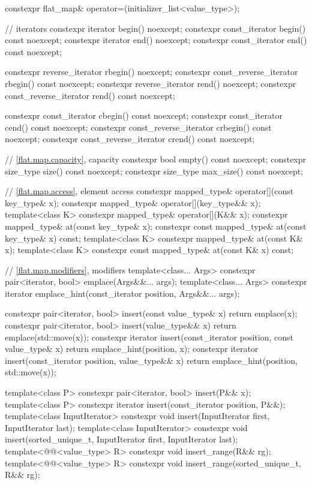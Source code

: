 \begin{codeblock}
{{    constexpr flat_map& operator=(initializer_list<value_type>);

    // iterators
    constexpr iterator               begin() noexcept;
    constexpr const_iterator         begin() const noexcept;
    constexpr iterator               end() noexcept;
    constexpr const_iterator         end() const noexcept;

    constexpr reverse_iterator       rbegin() noexcept;
    constexpr const_reverse_iterator rbegin() const noexcept;
    constexpr reverse_iterator       rend() noexcept;
    constexpr const_reverse_iterator rend() const noexcept;

    constexpr const_iterator         cbegin() const noexcept;
    constexpr const_iterator         cend() const noexcept;
    constexpr const_reverse_iterator crbegin() const noexcept;
    constexpr const_reverse_iterator crend() const noexcept;

    // \ref{flat.map.capacity}, capacity
    constexpr bool empty() const noexcept;
    constexpr size_type size() const noexcept;
    constexpr size_type max_size() const noexcept;

    // \ref{flat.map.access}, element access
    constexpr mapped_type& operator[](const key_type& x);
    constexpr mapped_type& operator[](key_type&& x);
    template<class K> constexpr mapped_type& operator[](K&& x);
    constexpr mapped_type& at(const key_type& x);
    constexpr const mapped_type& at(const key_type& x) const;
    template<class K> constexpr mapped_type& at(const K& x);
    template<class K> constexpr const mapped_type& at(const K& x) const;

    // \ref{flat.map.modifiers}, modifiers
    template<class... Args> constexpr pair<iterator, bool> emplace(Args&&... args);
    template<class... Args>
      constexpr iterator emplace_hint(const_iterator position, Args&&... args);

    constexpr pair<iterator, bool> insert(const value_type& x)
      { return emplace(x); }
    constexpr pair<iterator, bool> insert(value_type&& x)
      { return emplace(std::move(x)); }
    constexpr iterator insert(const_iterator position, const value_type& x)
      { return emplace_hint(position, x); }
    constexpr iterator insert(const_iterator position, value_type&& x)
      { return emplace_hint(position, std::move(x)); }

    template<class P> constexpr pair<iterator, bool> insert(P&& x);
    template<class P>
      constexpr iterator insert(const_iterator position, P&&);
    template<class InputIterator>
      constexpr void insert(InputIterator first, InputIterator last);
    template<class InputIterator>
      constexpr void insert(sorted_unique_t, InputIterator first, InputIterator last);
    template<@@<value_type> R>
      constexpr void insert_range(R&& rg);
    template<@@<value_type> R>
      constexpr void insert_range(sorted_unique_t, R&& rg);

}}
\end{codeblock}
